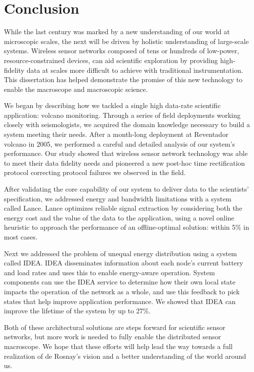 \chapter{Conclusion}
\label{chapter-conclusion}

While the last century was marked by a new understanding of our world at
microscopic scales, the next will be driven by holistic understanding of
large-scale systems. Wireless sensor networks composed of tens or hundreds of
low-power, resource-constrained devices, can aid scientific exploration by
providing high-fidelity data at scales more difficult to achieve with
traditional instrumentation. This dissertation has helped demonstrate the
promise of this new technology to enable the macroscope and macroscopic
science.

We began by describing how we tackled a single high data-rate scientific
application: volcano monitoring. Through a series of field deployments
working closely with seismologists, we acquired the domain knowledge
necessary to build a system meeting their needs. After a month-long
deployment at Reventador volcano in 2005, we performed a careful and detailed
analysis of our system's performance. Our study showed that wireless sensor
network technology was able to meet their data fidelity needs and pioneered a
new post-hoc time rectification protocol correcting protocol failures we
observed in the field.

\clearpage

After validating the core capability of our system to deliver data to the
scientists' specification, we addressed energy and bandwidth limitations with
a system called Lance. Lance optimizes reliable signal extraction by
considering both the energy cost and the value of the data to the
application, using a novel online heuristic to approach the performance of an
offline-optimal solution: within 5\% in most cases.

Next we addressed the problem of unequal energy distribution using a system
called IDEA. IDEA disseminates information about each node's current battery
and load rates and uses this to enable energy-aware operation. System
components can use the IDEA service to determine how their own local state
impacts the operation of the network as a whole, and use this feedback to
pick states that help improve application performance. We showed that IDEA
can improve the lifetime of the system by up to 27\%.

Both of these architectural solutions are steps forward for scientific sensor
networks, but more work is needed to fully enable the distributed sensor
macroscope. We hope that these efforts will help lead the way towards a full
realization of de Rosnay's vision and a better understanding of the world
around us.
